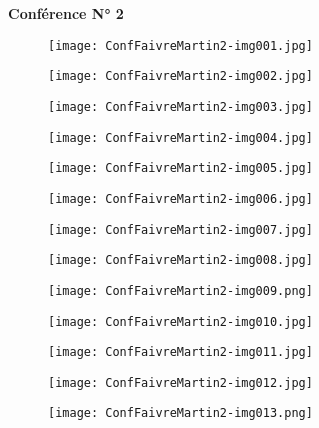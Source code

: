 \documentclass[a4paper]{article}
\title{}
\author{Florence}
\date{2012-07-11}
\begin{document}
\clearpage\setcounter{page}{1}\pagestyle{Standard}
{
\textbf{Conférence N° 2}}

\begin{figure}
\centering
\texttt{[image: ConfFaivreMartin2-img001.jpg]}
\end{figure}
\begin{figure}
\centering
\texttt{[image: ConfFaivreMartin2-img002.jpg]}
\end{figure}
\begin{figure}
\centering
\texttt{[image: ConfFaivreMartin2-img003.jpg]}
\end{figure}
\begin{figure}
\centering
\texttt{[image: ConfFaivreMartin2-img004.jpg]}
\end{figure}
\begin{figure}
\centering
\texttt{[image: ConfFaivreMartin2-img005.jpg]}
\end{figure}
\begin{figure}
\centering
\texttt{[image: ConfFaivreMartin2-img006.jpg]}
\end{figure}
\begin{figure}
\centering
\texttt{[image: ConfFaivreMartin2-img007.jpg]}
\end{figure}
\begin{figure}
\centering
\texttt{[image: ConfFaivreMartin2-img008.jpg]}
\end{figure}
\begin{figure}
\centering
\texttt{[image: ConfFaivreMartin2-img009.png]}
\end{figure}
\begin{figure}
\centering
\texttt{[image: ConfFaivreMartin2-img010.jpg]}
\end{figure}
\begin{figure}
\centering
\texttt{[image: ConfFaivreMartin2-img011.jpg]}
\end{figure}
\begin{figure}
\centering
\texttt{[image: ConfFaivreMartin2-img012.jpg]}
\end{figure}
\begin{figure}
\centering
\texttt{[image: ConfFaivreMartin2-img013.png]}
\end{figure}
\end{document}
